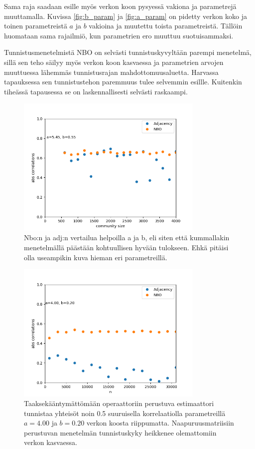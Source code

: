 \documentclass[finnish,12pt,a4paper,pdftex,sci,utf8]{aaltothesis}
\begin{document}
Sama raja saadaan esille myös verkon koon pysyessä vakiona ja parametrejä muuttamalla. Kuvissa \ref{fig:b_param} ja \ref{fig:a_param} on pidetty verkon koko ja toinen parametreistä $a$ ja $b$ vakioina ja muutettu toista parametreistä. Tällöin huomataan sama rajailmiö, kun parametrien ero muuttuu suotuisammaksi.

Tunnistusmenetelmistä NBO on selvästi tunnistuskyvyltään parempi menetelmä, sillä sen teho säilyy myös verkon koon kasvaessa ja parametrien arvojen muuttuessa lähemmäs tunnistusrajan mahdottomuusaluetta. Harvassa tapauksessa sen tunnistustehon paremmuus tulee selvemmin esillle. Kuitenkin tiheässä tapausessa se on laskennallisesti selvästi raskaampi.

\begin{figure}
	\centering
	\includegraphics[width = 0.8\textwidth]{adj_nbo_sp_easy.png}
	\caption{Nbo:n ja adj:n vertailua helpoilla a ja b, eli siten että kummallakin menetelmällä päästään kohtuullisen hyvään tulokseen. Ehkä pitäisi olla useampikin kuva hieman eri parametreillä.}
	\label{fig:adj_nbo_sp_easy}
\end{figure}

\begin{figure}
	\label{fig:adj_nbo_sp_hard}
	\centering
		\includegraphics[width = 0.8\textwidth]{adj_nbo_hard_presentation.png}
		\caption{Taaksekääntymättömään operaattoriin perustuva estimaattori tunnistaa yhteisöt noin 0.5 suuruisella korrelaatiolla parametreillä $a = 4.00$ ja $b = 0.20$ verkon koosta riippumatta. Naapuruusmatriisiin perustuvan menetelmän tunnistuskyky heikkenee olemattomiin verkon kasvaessa.}
\end{figure}
\end{document}
